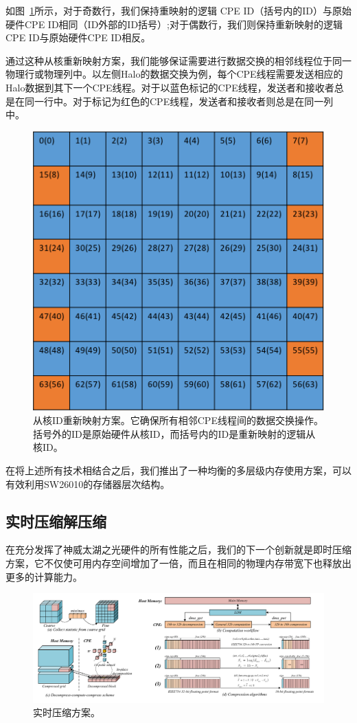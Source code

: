 \documentclass[degree=doctor]{thuthesis}
\begin{document}
如图~\ref{fig:id-remapping}所示，对于奇数行，我们保持重映射的逻辑 CPE ID（括号内的ID）与原始硬件CPE ID相同（ID外部的ID括号）;对于偶数行，我们则保持重新映射的逻辑CPE ID与原始硬件CPE ID相反。

通过这种从核重新映射方案，我们能够保证需要进行数据交换的相邻线程位于同一物理行或物理列中。以左侧Halo的数据交换为例，每个CPE线程需要发送相应的Halo数据到其下一个CPE线程。对于以蓝色标记的CPE线程，发送者和接收者总是在同一行中。对于标记为红色的CPE线程，发送者和接收者则总是在同一列中。

\begin{figure}[ht]
\centering
\includegraphics[width=0.5\columnwidth]{awp_register_remap.png}
\caption{
从核ID重新映射方案。它确保所有相邻CPE线程间的数据交换操作。 括号外的ID是原始硬件从核ID，而括号内的ID是重新映射的逻辑从核ID。}
\label{fig:id-remapping}
\end{figure}

在将上述所有技术相结合之后，我们推出了一种均衡的多层级内存使用方案，可以有效利用SW26010的存储器层次结构。

\subsection{实时压缩解压缩}

在充分发挥了神威太湖之光硬件的所有性能之后，我们的下一个创新就是即时压缩方案，它不仅使可用内存空间增加了一倍，而且在相同的物理内存带宽下也释放出更多的计算能力。

\begin{figure}[ht]
\centering

\includegraphics[width=1.0\textwidth]{compression.pdf}
\caption{实时压缩方案。}
\label{fig:compression}
\end{figure}
\end{document}
